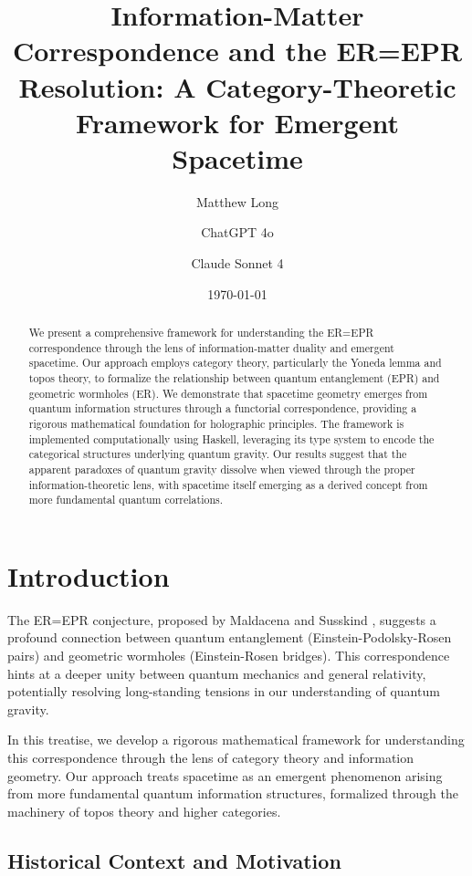\documentclass[11pt,a4paper]{article}
\title{Information-Matter Correspondence and the ER=EPR Resolution: A Category-Theoretic Framework for Emergent Spacetime}
\author[1]{Matthew Long}
\author[2]{ChatGPT 4o}
\author[3]{Claude Sonnet 4}
\affil[1]{Yoneda AI}
\affil[2]{OpenAI}
\affil[3]{Anthropic}
\date{\today}
\begin{document}
\maketitle

\begin{abstract}
We present a comprehensive framework for understanding the ER=EPR correspondence through the lens of information-matter duality and emergent spacetime. Our approach employs category theory, particularly the Yoneda lemma and topos theory, to formalize the relationship between quantum entanglement (EPR) and geometric wormholes (ER). We demonstrate that spacetime geometry emerges from quantum information structures through a functorial correspondence, providing a rigorous mathematical foundation for holographic principles. The framework is implemented computationally using Haskell, leveraging its type system to encode the categorical structures underlying quantum gravity. Our results suggest that the apparent paradoxes of quantum gravity dissolve when viewed through the proper information-theoretic lens, with spacetime itself emerging as a derived concept from more fundamental quantum correlations.
\end{abstract}

\tableofcontents
\newpage

\section{Introduction}

The ER=EPR conjecture, proposed by Maldacena and Susskind \cite{maldacena2013}, suggests a profound connection between quantum entanglement (Einstein-Podolsky-Rosen pairs) and geometric wormholes (Einstein-Rosen bridges). This correspondence hints at a deeper unity between quantum mechanics and general relativity, potentially resolving long-standing tensions in our understanding of quantum gravity.

In this treatise, we develop a rigorous mathematical framework for understanding this correspondence through the lens of category theory and information geometry. Our approach treats spacetime as an emergent phenomenon arising from more fundamental quantum information structures, formalized through the machinery of topos theory and higher categories.

\subsection{Historical Context and Motivation}
\end{document}
